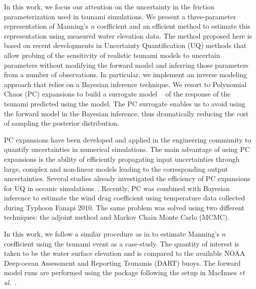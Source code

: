 In this work, we focus our attention on the uncertainty in the friction
parameterization used in tsunami simulations. We present a three-parameter 
representation of Manning's $n$ coefficient and an efficient method
to estimate this representation using measured water elevation data. The method proposed here 
is based on recent developments in Uncertainty Quantification (UQ) methods that allow 
probing of the sensitivity of realistic tsunami  models to uncertain parameters
without modifying the forward model and inferring those parameters
from a number of observations.  In particular, we implement an inverse modeling
approach that relies on a Bayesian inference technique.  We resort to
Polynomial Chaos (PC) expansions to build a surrogate model ~\cite{Najm:2009,Alexanderian2012,Elsheikh2014,Young2013}
of the response of the tsunami predicted using the \geoclaw model.
The PC surrogate enables us to avoid using the forward model in
the Bayesian inference, thus dramatically reducing the cost of sampling the
posterior distribution.

PC expansions have been developed and applied in the engineering community to
quantify uncertainties in numerical simulations.  The main advantage of
using PC expansions is the ability of efficiently propagating input uncertainties through 
large, complex and non-linear models leading to the corresponding output uncertainties. 
Several studies already investigated the efficiency of PC expansions for 
UQ in oceanic simulations~\citep{thacker2012,ashwanth2010,Alexanderian2012,sraj:2013a}. 
Recently, PC was combined with Bayesian inference to estimate the wind drag coefficient 
using temperature data collected during Typhoon Fanapi 2010. The same problem was 
solved using two different techniques: the adjoint method and Markov Chain Monte Carlo
(MCMC)\cite{sraj:2013a,sraj:2013b}.

In this work, we follow a similar procedure as in \cite{sraj:2013a,sraj:2013b}
to estimate Manning's $n$ coefficient using the \tohoku tsunami
event as a case-study. The quantity of interest is taken to be the water surface
elevation and is compared to the available NOAA Deep-ocean Assessment and
Reporting Tsunamis (DART) buoys.  The forward model runs are performed using the
\geoclaw package following the setup in MacInnes \emph{et al.}~\cite{MacInnes:2013cr}.

